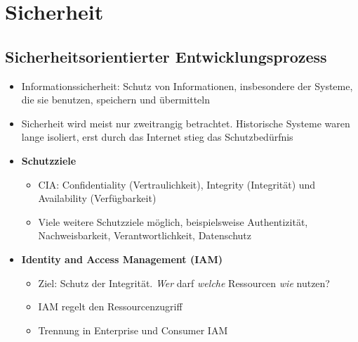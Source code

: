 \section{Sicherheit}

\subsection{Sicherheitsorientierter Entwicklungsprozess}
\begin{itemize}
	\item Informationssicherheit: Schutz von Informationen, insbesondere der Systeme, die sie benutzen, speichern und übermitteln
	\item Sicherheit wird meist nur zweitrangig betrachtet. Historische Systeme waren lange isoliert, erst durch das Internet stieg das Schutzbedürfnis
	\item \textbf{Schutzziele}
	\begin{itemize}
		\item CIA: Confidentiality (Vertraulichkeit), Integrity (Integrität) und Availability (Verfügbarkeit)
		\item Viele weitere Schutzziele möglich, beispielsweise Authentizität, Nachweisbarkeit, Verantwortlichkeit, Datenschutz
	\end{itemize}
	\item \textbf{Identity and Access Management (IAM)}
	\begin{itemize}
		\item Ziel: Schutz der Integrität. \textit{Wer} darf \textit{welche} Ressourcen \textit{wie} nutzen?
		\item IAM regelt den Ressourcenzugriff
		\item Trennung in Enterprise und Consumer IAM
	\end{itemize}
\end{itemize}


